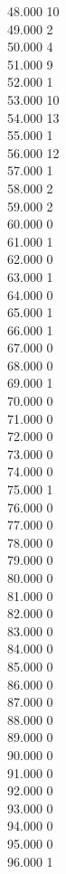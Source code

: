 { 48.000	10 \\
 49.000	2 \\
 50.000	4 \\
 51.000	9 \\
 52.000	1 \\
 53.000	10 \\
 54.000	13 \\
 55.000	1 \\
 56.000	12 \\
 57.000	1 \\
 58.000	2 \\
 59.000	2 \\
 60.000	0 \\
 61.000	1 \\
 62.000	0 \\
 63.000	1 \\
 64.000	0 \\
 65.000	1 \\
 66.000	1 \\
 67.000	0 \\
 68.000	0 \\
 69.000	1 \\
 70.000	0 \\
 71.000	0 \\
 72.000	0 \\
 73.000	0 \\
 74.000	0 \\
 75.000	1 \\
 76.000	0 \\
 77.000	0 \\
 78.000	0 \\
 79.000	0 \\
 80.000	0 \\
 81.000	0 \\
 82.000	0 \\
 83.000	0 \\
 84.000	0 \\
 85.000	0 \\
 86.000	0 \\
 87.000	0 \\
 88.000	0 \\
 89.000	0 \\
 90.000	0 \\
 91.000	0 \\
 92.000	0 \\
 93.000	0 \\
 94.000	0 \\
 95.000	0 \\
 96.000	1 \\
}
